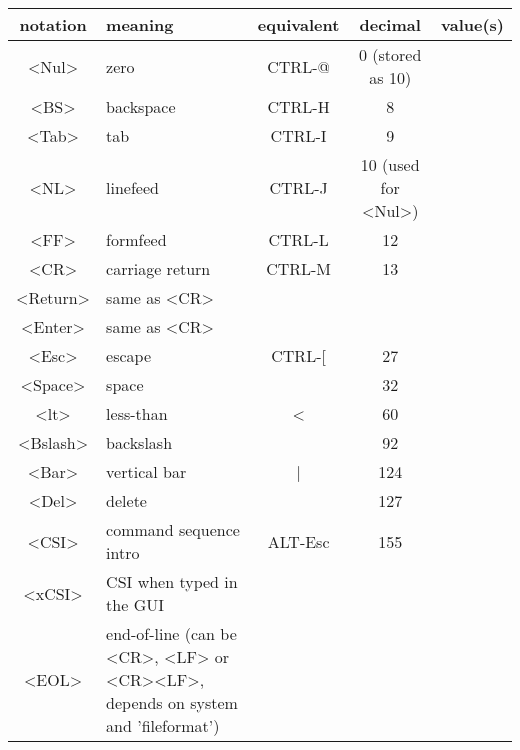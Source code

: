 \begin{description}
\begin{tabularx}{\textwidth}{|c|X|c|c|c|} %
				\hline
				notation & meaning                   & equivalent & decimal             & value(s)\\ \hline
				<Nul>    & zero                      & CTRL-@     & 0 (stored as 10)    & \label{<Nul>}\\
				<BS>     & backspace                 & CTRL-H     & 8                   & \label{backspace}\\
				<Tab>    & tab                       & CTRL-I     & 9                   & \label{tab} \label{Tab}\\
				<NL>     & linefeed                  & CTRL-J     & 10 (used for <Nul>) & \label{linefeed}\\
				<FF>     & formfeed                  & CTRL-L     & 12                  & \label{formfeed}\\
				<CR>     & carriage return           & CTRL-M     & 13                  & \label{carriage-return}\\
				<Return> & same as <CR>              &            &                     & \label{<Return>}\\
				<Enter>  & same as <CR>              &            &                     & \label{<Enter>}\\
				<Esc>    & escape                    & CTRL-[     & 27                  & \label{escape} \label{<Esc>}\\
				<Space>  & space                     &            & 32                  & \label{space}\\
				<lt>     & less-than                 & <          & 60                  & \label{<lt>}\\
				<Bslash> & backslash                 & \          & 92                  & \label{backslash} \label{<Bslash>}\\
				<Bar>    & vertical bar              & |          & 124                 & \label{<Bar>}\\
				<Del>    & delete                    &            & 127\\
				<CSI>    & command sequence intro    & ALT-Esc    & 155                 & \label{<CSI>}\\
				<xCSI>   & CSI when typed in the GUI &            &                     & \label{<xCSI>}\\

				<EOL> & end-of-line (can be <CR>, <LF> or <CR><LF>, depends on system and 'fileformat') & & & \label{<EOL>}\\ %


\end{tabularx}
\end{description}
